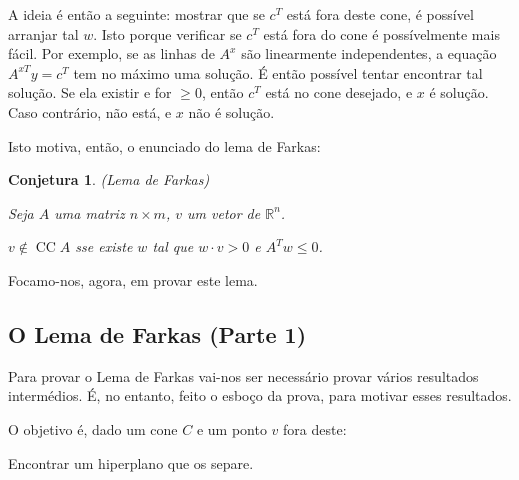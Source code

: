\documentclass{article}
\DeclareMathOperator{\CC}{CC}
\newcommand{\R}{\mathbb{R}}
\newtheorem{conjetura}{Conjetura}
\theoremstyle{definition}
\begin{document}
	A ideia é então a seguinte: mostrar que se $c^T$ está fora deste cone, é possível arranjar tal $w$. Isto porque verificar se $c^T$ está fora do cone é possívelmente mais fácil. Por exemplo, se as linhas de $A^x$ são linearmente independentes, a equação $A^{xT} y = c^T$ tem no máximo uma solução. É então possível tentar encontrar tal solução. Se ela existir e for $\geq 0$, então $c^T$ está no cone desejado, e $x$ é solução. Caso contrário, não está, e $x$ não é solução.
	
	Isto motiva, então, o enunciado do lema de Farkas:
	
	\begin{conjetura} (Lema de Farkas)
	
	Seja $A$ uma matriz $n \times m$, $v$ um vetor de $\R^n$.
	
	$v \not\in \CC A$ sse existe $w$ tal que $w \cdot v > 0$ e $A^T w \leq 0$.
	\end{conjetura}
	
	Focamo-nos, agora, em provar este lema.
	
	\subsection{O Lema de Farkas (Parte 1)}
	
	Para provar o Lema de Farkas vai-nos ser necessário provar vários resultados intermédios. É, no entanto, feito o esboço da prova, para motivar esses resultados.
	
	O objetivo é, dado um cone $C$ e um ponto $v$ fora deste:
	
	
	Encontrar um hiperplano que os separe.
	
	
\end{document}
